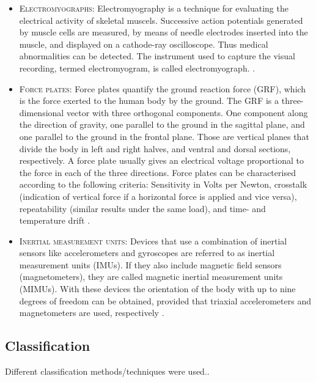 \begin{itemize}

\item \textsc{Electromyographs:} Electromyography is a technique for evaluating the electrical activity of skeletal muscels. Successive action potentials generated by muscle cells are measured, by means of needle electrodes inserted into the muscle, and displayed on a cathode-ray oscilloscope. Thus medical abnormalities can be detected. The instrument used to capture the visual recording, termed electromyogram, is called electromyograph. \cite{encyclopedia_britannica_electromyography_2014}.

\item \textsc{Force plates:} Force plates quantify the ground reaction force (GRF), which is the force exerted to the human body by the ground. The GRF is a three-dimensional vector with three orthogonal components. One component along the direction of gravity, one parallel to the ground in the sagittal plane, and one parallel to the ground in the frontal plane. Those are vertical planes that divide the body in left and right halves, and ventral and dorsal sections, respectively. A force plate usually gives an electrical voltage proportional to the force in each of the three directions. Force plates can be characterised according to the following criteria: Sensitivity in Volts per Newton, crosstalk (indication of vertical force if a horizontal force is applied and vice versa), repeatability (similar results under the same load), and time- and temperature drift \cite{griffiths_principles_2006}.

\item \textsc{Inertial measurement units:} Devices that use a combination of inertial sensors like accelerometers and gyroscopes are referred to as inertial measurement units (IMUs). If they also include magnetic field sensors (magnetometers), they are called magnetic inertial measurement units (MIMUs). With these devices the orientation of the body with up to nine degrees of freedom can be obtained, provided that triaxial accelerometers and magnetometers are used, respectively \cite{olivares_vicente_signal_2013}.

\end{itemize}

\subsection{Classification}

Different classification methods/techniques were used..


